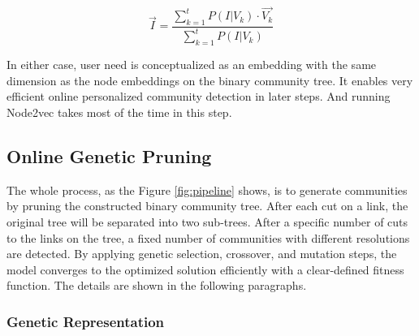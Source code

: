 \begin{equation}
\vec{I} = \frac{\sum_{k=1}^{t} P(I|V_k) \cdot \vec{V_k}}{\sum_{k=1}^{t} P(I|V_k)}
\end{equation}

In either case, user need is conceptualized as an embedding with the same dimension as the node embeddings on the binary community tree. It enables very efficient online personalized community detection in later steps. And running Node2vec takes most of the time in this step.   

\subsection{Online Genetic Pruning} \label{sc:c3_online}

The whole process, as the Figure \ref{fig:pipeline} shows, is to generate communities by pruning the constructed binary community tree. After each cut on a link, the original tree  will be separated into two sub-trees. After a specific number of cuts to the links on the tree, a fixed number of communities with different resolutions are detected.  By applying genetic selection, crossover, and mutation steps, the model converges to the optimized solution efficiently with a clear-defined fitness function. The details are shown in the following paragraphs.

\subsubsection{Genetic Representation} 

